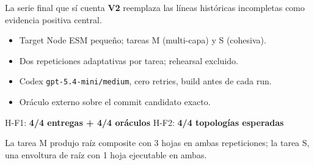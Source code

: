 \documentclass[10pt,aspectratio=169]{beamer}
\begin{document}
\begin{frame}{La serie final que sí cuenta}
  \textbf{V2} reemplaza las líneas históricas incompletas como evidencia
  positiva central.

  \begin{itemize}
    \item Target Node ESM pequeño; tareas M (multi-capa) y S (cohesiva).
    \item Dos repeticiones adaptativas por tarea; rehearsal excluido.
    \item Codex \texttt{gpt-5.4-mini/medium}, cero retries, build antes de cada run.
    \item Oráculo externo sobre el commit candidato exacto.
  \end{itemize}

  \begin{center}
    \large H-F1: \textbf{4/4 entregas + 4/4 oráculos} \qquad
    H-F2: \textbf{4/4 topologías esperadas}
  \end{center}

  \small La tarea M produjo raíz composite con 3 hojas en ambas repeticiones;
  la tarea S, una envoltura de raíz con 1 hoja ejecutable en ambas.
\end{frame}
\end{document}
